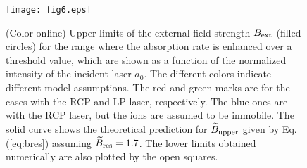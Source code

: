 \begin{figure}
\texttt{[image: fig6.eps]}%
\caption{
(Color online)
Upper limits of the external field strength $B_{\rm ext}$ (filled
circles) for the range where the absorption rate is enhanced over a
threshold value, which are shown as a function of
the normalized intensity of the incident laser $a_0$. 
The different colors indicate different model assumptions.
The red and green marks are for the cases with the RCP and LP laser,
respectively.
The blue ones are with the RCP laser, but the ions are assumed to
be immobile.
The solid curve shows the theoretical prediction for
$\widetilde{B}_{\rm upper}$ given by Eq. (\ref{eq:bres}) assuming
$\widetilde{B}_{\rm res} = 1.7$.
The lower limits obtained numerically are also plotted by the open
squares.
\label{fig:6}}
\end{figure}
